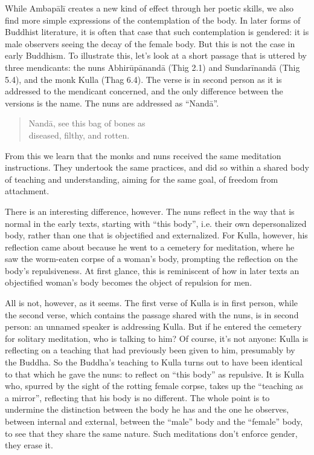 \documentclass[12pt,openany]{book}%
\begin{document}
While \textsanskrit{Ambapālī} creates a new kind of effect through her poetic skills, we also find more simple expressions of the contemplation of the body. In later forms of Buddhist literature, it is often that case that such contemplation is gendered: it is male observers seeing the decay of the female body. But this is not the case in early Buddhism. To illustrate this, let’s look at a short passage that is uttered by three mendicants: the nuns \textsanskrit{Abhirūpānandā} (Thig 2.1) and \textsanskrit{Sundarīnandā} (Thig 5.4), and the monk Kulla (Thag 6.4). The verse is in second person as it is addressed to the mendicant concerned, and the only difference between the versions is the name. The nuns are addressed as “\textsanskrit{Nandā}”.

\begin{quotation}%
\textsanskrit{Nandā}, see this bag of bones as\\

diseased, filthy, and rotten.

%
\end{quotation}

From this we learn that the monks and nuns received the same meditation instructions. They undertook the same practices, and did so within a shared body of teaching and understanding, aiming for the same goal, of freedom from attachment.

There is an interesting difference, however. The nuns reflect in the way that is normal in the early texts, starting with “this body”, i.e. their own depersonalized body, rather than one that is objectified and externalized. For Kulla, however, his reflection came about because he went to a cemetery for meditation, where he saw the worm-eaten corpse of a woman’s body, prompting the reflection on the body’s repulsiveness. At first glance, this is reminiscent of how in later texts an objectified woman’s body becomes the object of repulsion for men.

All is not, however, as it seems. The first verse of Kulla is in first person, while the second verse, which contains the passage shared with the nuns, is in second person: an unnamed speaker is addressing Kulla. But if he entered the cemetery for solitary meditation, who is talking to him? Of course, it’s not anyone: Kulla is reflecting on a teaching that had previously been given to him, presumably by the Buddha. So the Buddha’s teaching to Kulla turns out to have been identical to that which he gave the nuns: to reflect on “this body” as repulsive. It is Kulla who, spurred by the sight of the rotting female corpse, takes up the “teaching as a mirror”, reflecting that his body is no different. The whole point is to undermine the distinction between the body he has and the one he observes, between internal and external, between the “male” body and the “female” body, to see that they share the same nature. Such meditations don’t enforce gender, they erase it.
\end{document}
